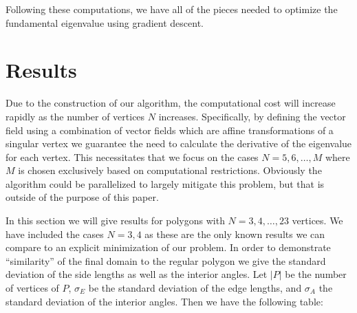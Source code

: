 \documentclass[12pt]{report}
\numberwithin{definition}{section}
\begin{document}
Following these computations, we have all of the pieces needed to optimize the fundamental eigenvalue using gradient descent.

\break

\section{Results}

Due to the construction of our algorithm, the computational cost will increase rapidly as the number of vertices $N$ increases.
Specifically, by defining the vector field using a combination of vector fields which are affine transformations of a singular vertex we guarantee the need to calculate the derivative of the eigenvalue for each vertex.
This necessitates that we focus on the cases $N=5,6,\ldots,M$ where $M$ is chosen exclusively based on computational restrictions.
Obviously the algorithm could be parallelized to largely mitigate this problem, but that is outside of the purpose of this paper.



In this section we will give results for polygons with $N=3,4,\ldots,23$ vertices.
We have included the cases $N=3,4$ as these are the only known results we can compare to an explicit minimization of our problem.
In order to demonstrate ``similarity'' of the final domain to the regular polygon we give the standard deviation of the side lengths as well as the interior angles.
Let $| P |$ be the number of vertices of $P$, $\sigma_{E}$ be the standard deviation of the edge lengths, and $\sigma_{A}$ the standard deviation of the interior angles.
Then we have the following table:
\end{document}
